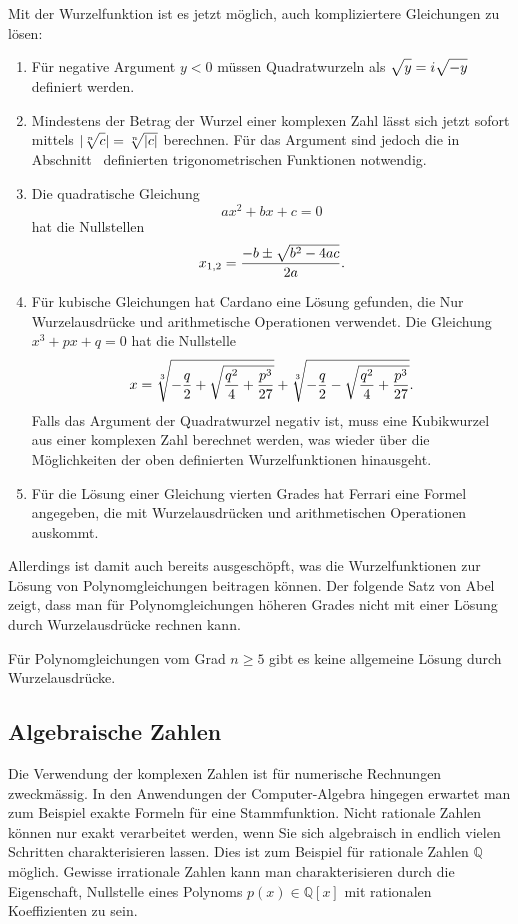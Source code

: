 Mit der Wurzelfunktion ist es jetzt möglich, auch kompliziertere
Gleichungen zu lösen:
\begin{enumerate}
\item
Für negative Argument $y<0$ müssen Quadratwurzeln als
$\sqrt{y\mathstrut}=i\sqrt{-y\mathstrut}$ definiert werden.
\item
Mindestens der Betrag der Wurzel einer komplexen Zahl lässt
sich jetzt sofort mittels $|\root{n}\of{c\mathstrut}|=\root{n}\of{|c|\mathstrut}$
berechnen.
Für das Argument sind jedoch die in
Abschnitt~\label{buch:geometrie:section:trigonometrisch} definierten
trigonometrischen Funktionen notwendig.
\item
Die quadratische Gleichung 
\[
ax^2+bx+c=0
\]
hat die Nullstellen
\[
x_{1,2} = \frac{-b\pm\sqrt{b^2-4ac\mathstrut}}{2a}.
\]
\item
Für kubische Gleichungen hat Cardano eine Lösung gefunden, die
Nur Wurzelausdrücke und arithmetische Operationen verwendet.
Die Gleichung $x^3+px+q=0$ hat die Nullstelle
\[
x
=
\root{3}\of{-\frac{q}2+\sqrt{\frac{q^2}4+\frac{p^3}{27}}}
+
\root{3}\of{-\frac{q}2-\sqrt{\frac{q^2}4+\frac{p^3}{27}}}.
\]
Falls das Argument der Quadratwurzel negativ ist, muss eine
Kubikwurzel aus einer komplexen Zahl berechnet werden, was
wieder über die Möglichkeiten der oben definierten Wurzelfunktionen
hinausgeht.
\item
Für die Lösung einer Gleichung vierten Grades hat Ferrari eine
Formel angegeben, die mit Wurzelausdrücken und arithmetischen
Operationen auskommt.
\end{enumerate}

Allerdings ist damit auch bereits ausgeschöpft, was die
Wurzelfunktionen zur Lösung von Polynomgleichungen beitragen
können.
Der folgende Satz von Abel zeigt, dass man für Polynomgleichungen
höheren Grades nicht mit einer Lösung durch Wurzelausdrücke
rechnen kann.

\begin{satz}[Abel]
\label{buch:potenzen:satz:abel}
Für Polynomgleichungen vom Grad $n\ge 5$ gibt es keine allgemeine
Lösung durch Wurzelausdrücke.
\end{satz}



%
%
\subsection{Algebraische Zahlen}
Die Verwendung der komplexen Zahlen ist für numerische Rechnungen
zweckmässig.
In den Anwendungen der Computer-Algebra hingegen erwartet man zum
Beispiel exakte Formeln für eine Stammfunktion.
%
%
Nicht rationale Zahlen können nur exakt verarbeitet werden, wenn
Sie sich algebraisch in endlich vielen Schritten charakterisieren
lassen.
Dies ist zum Beispiel für rationale Zahlen $\mathbb{Q}$ möglich.
Gewisse irrationale Zahlen kann man charakterisieren durch 
die Eigenschaft, Nullstelle eines Polynoms $p(x)\in\mathbb{Q}[x]$
mit rationalen Koeffizienten zu sein.

